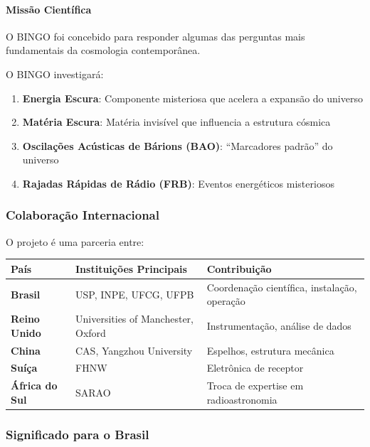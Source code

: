 \paragraph{Missão Científica}

O BINGO foi concebido para responder algumas das perguntas mais fundamentais da cosmologia contemporânea.

O BINGO investigará:

\begin{enumerate}
\item \textbf{Energia Escura}: Componente misteriosa que acelera a expansão do universo
\item \textbf{Matéria Escura}: Matéria invisível que influencia a estrutura cósmica
\item \textbf{Oscilações Acústicas de Bárions (BAO)}: ``Marcadores padrão'' do universo
\item \textbf{Rajadas Rápidas de Rádio (FRB)}: Eventos energéticos misteriosos
\end{enumerate}

\subsubsection{Colaboração Internacional}

O projeto é uma parceria entre:

\bigskip\noindent
\begin{tabular}{p{}p{}p{}}
\toprule
País & Instituições Principais & Contribuição \\
\hline
\textbf{Brasil} & USP, INPE, UFCG, UFPB & Coordenação científica, instalação, operação \\
\textbf{Reino Unido} & Universities of Manchester, Oxford & Instrumentação, análise de dados \\
\textbf{China} & CAS, Yangzhou University & Espelhos, estrutura mecânica \\
\textbf{Suíça} & FHNW & Eletrônica de receptor \\
\textbf{África do Sul} & SARAO & Troca de expertise em radioastronomia \\
\bottomrule
\end{tabular}

\bigskip

\subsubsection{Significado para o Brasil}

